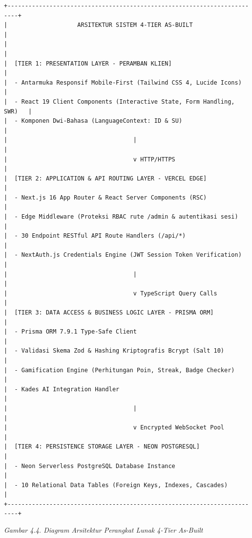 \documentclass[
  indonesian,
  12pt,
]{report}
\begin{document}
\begin{verbatim}
+-------------------------------------------------------------------------+
|                    ARSITEKTUR SISTEM 4-TIER AS-BUILT                    |
|                                                                         |
|  [TIER 1: PRESENTATION LAYER - PERAMBAN KLIEN]                          |
|  - Antarmuka Responsif Mobile-First (Tailwind CSS 4, Lucide Icons)      |
|  - React 19 Client Components (Interactive State, Form Handling, SWR)   |
|  - Komponen Dwi-Bahasa (LanguageContext: ID & SU)                       |
|                                    |                                    |
|                                    v HTTP/HTTPS                         |
|  [TIER 2: APPLICATION & API ROUTING LAYER - VERCEL EDGE]                |
|  - Next.js 16 App Router & React Server Components (RSC)                |
|  - Edge Middleware (Proteksi RBAC rute /admin & autentikasi sesi)       |
|  - 30 Endpoint RESTful API Route Handlers (/api/*)                      |
|  - NextAuth.js Credentials Engine (JWT Session Token Verification)      |
|                                    |                                    |
|                                    v TypeScript Query Calls             |
|  [TIER 3: DATA ACCESS & BUSINESS LOGIC LAYER - PRISMA ORM]              |
|  - Prisma ORM 7.9.1 Type-Safe Client                                    |
|  - Validasi Skema Zod & Hashing Kriptografis Bcrypt (Salt 10)           |
|  - Gamification Engine (Perhitungan Poin, Streak, Badge Checker)        |
|  - Kades AI Integration Handler                                         |
|                                    |                                    |
|                                    v Encrypted WebSocket Pool           |
|  [TIER 4: PERSISTENCE STORAGE LAYER - NEON POSTGRESQL]                  |
|  - Neon Serverless PostgreSQL Database Instance                         |
|  - 10 Relational Data Tables (Foreign Keys, Indexes, Cascades)          |
+-------------------------------------------------------------------------+
\end{verbatim}

\emph{Gambar 4.4. Diagram Arsitektur Perangkat Lunak 4-Tier As-Built}
\end{document}
